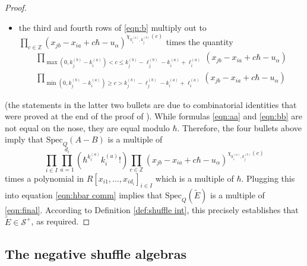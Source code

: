\documentclass{amsart}
\def\BZ{{\mathbb{Z}}}
\def\CS{{\mathcal{S}}}
\def\ring{R}
\begin{document}
\begin{proof}
\begin{itemize}[leftmargin=*]
\medskip 

\item the third and fourth rows of \eqref{eqn:b} multiply out to $\prod_{c \in \BZ} \left(x_{jb} - x_{ia} + c\hbar - u_\alpha\right)^{\chi_{k_i^{(a)},k_j^{(b)}}(c)}$ times the quantity
\begin{multline}
\label{eqn:bb}
\prod_{\max(0,k_j^{(b)}-k_i^{(a)})<c\leq k_j^{(b)}-\ell_j^{(b)}-k_i^{(a)}+\ell_i^{(a)}} (x_{jb}-x_{ia} + c\hbar - u_\alpha) \\ \prod_{\min(0,k_j^{(b)}-k_i^{(a)})\geq c > k_j^{(b)}-\ell_j^{(b)}-k_i^{(a)}+\ell_i^{(a)}} (x_{jb}-x_{ia} + c\hbar - u_\alpha)
\end{multline}

\end{itemize}

\medskip 

\noindent (the statements in the latter two bullets are due to combinatorial identities that were proved at the end of the proof of \cite[Proposition 5.1]{JNCoulomb}). While formulas \eqref{eqn:aa} and \eqref{eqn:bb} are not equal on the nose, they are equal modulo $\hbar$. Therefore, the four bullets above imply that $\text{Spec}_Q(A-B)$ is a multiple of 
\begin{equation}
\label{eqn:final}
\prod_{i \in I} \prod_{a=1}^{d_i} \left( \hbar^{k_i^{(a)}}k_i^{(a)}! \right) \prod_{c \in \BZ} \left(x_{jb} - x_{ia} + c\hbar - u_\alpha\right)^{\chi_{k_i^{(a)},k_j^{(b)}}(c)}
\end{equation}
times a polynomial in $\ring[x_{i1},\dots,x_{id_i}]_{i \in I}$ which is a multiple of $\hbar$. Plugging this into equation \eqref{eqn:hbar comm} implies that $\text{Spec}_Q(\tilde{E})$ is a multiple of \eqref{eqn:final}. According to Definition \ref{def:shuffle int}, this precisely establishes that $\tilde{E} \in \CS^+$, as required. \end{proof}

\medskip

\subsection{The negative shuffle algebras}
\end{document}
